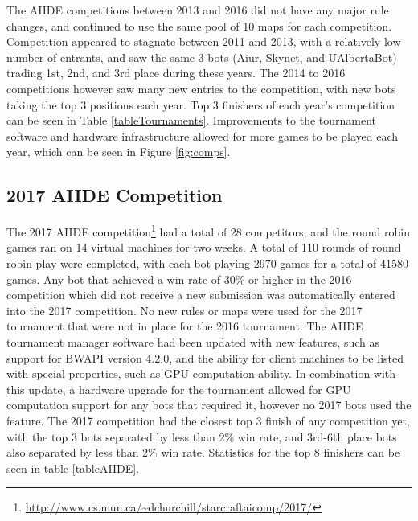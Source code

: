 The AIIDE competitions between 2013 and 2016 did not have any major rule changes, and continued to use the same pool of 10 maps for each competition. Competition appeared to stagnate between 2011 and 2013, with a relatively low number of entrants, and saw the same 3 bots (Aiur, Skynet, and UAlbertaBot) trading 1st, 2nd, and 3rd place during these years. The 2014 to 2016 competitions however saw many new entries to the competition, with new bots taking the top 3 positions each year. Top 3 finishers of each year's competition can be seen in Table \ref{tableTournaments}. Improvements to the tournament software and hardware infrastructure allowed for more games to be played each year, which can be seen in Figure \ref{fig:comps}.

\subsection{2017 AIIDE Competition}\label{subsecAIIDEnews}

The 2017 AIIDE competition\footnote{\url{http://www.cs.mun.ca/~dchurchill/starcraftaicomp/2017/}} had a total of 28 competitors, and the round robin games ran on 14 virtual machines for two weeks. A total of 110 rounds of round robin play were completed, with each bot playing 2970 games for a total of 41580 games. Any bot that achieved a win rate of 30\% or higher in the 2016 competition which did not receive a new submission was automatically entered into the 2017 competition. No new rules or maps were used for the 2017 tournament that were not in place for the 2016 tournament. The AIIDE tournament manager software had been updated with new features, such as support for BWAPI version 4.2.0, and the ability for client machines to be listed with special properties, such as GPU computation ability. In combination with this update, a hardware upgrade for the tournament allowed for GPU computation support for any bots that required it, however no 2017 bots used the feature. The 2017 competition had the closest top 3 finish of any competition yet, with the top 3 bots separated by less than 2\% win rate, and 3rd-6th place bots also separated by less than 2\% win rate. Statistics for the top 8 finishers can be seen in table \ref{tableAIIDE}.


